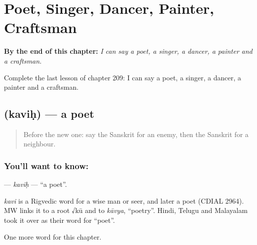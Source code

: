 
\chapter{Poet, Singer, Dancer, Painter, Craftsman}
\label{ch:sa-poet-singer-dancer-painter-craftsman}

\begin{chapteropening}
\textbf{By the end of this chapter:} \emph{I can say a poet, a singer, a dancer, a painter and a craftsman.}

Complete the last lesson of chapter 209: I can say a poet, a singer, a dancer, a painter and a craftsman.
\end{chapteropening}

\section[\texorpdfstring{\sk{कविः} (kaviḥ)}{कविः (kaviḥ)}]{ (kaviḥ) — a poet}

\label{lesson:SA-C209-kavih}



\begin{quote}
Before the new one: say the Sanskrit for an enemy, then the Sanskrit for a neighbour.
\end{quote}

\subsection*{You'll want to know: }
\textbf{} — \emph{kaviḥ} — \textquotedblleft{}a poet\textquotedblright{}.

\begin{cousinweb}
\emph{kavi} is a Rigvedic word for a wise man or seer, and later a poet (CDIAL 2964). MW links it to a root √kū and to \emph{kāvya}, \textquotedblleft{}poetry\textquotedblright{}. Hindi, Telugu and Malayalam took it over as their word for \textquotedblleft{}poet\textquotedblright{}.
\end{cousinweb}

\begin{grammarlens}[title={What you've built}]
One more word for this chapter.
\end{grammarlens}

